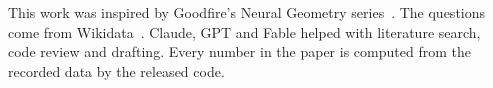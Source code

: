 This work was inspired by Goodfire's Neural Geometry series~\citep{goodfire2026the}. The questions come from Wikidata~\citep{vrandecic2014wikidata}. Claude, GPT and Fable helped with literature search, code review and drafting. Every number in the paper is computed from the recorded data by the released code.
